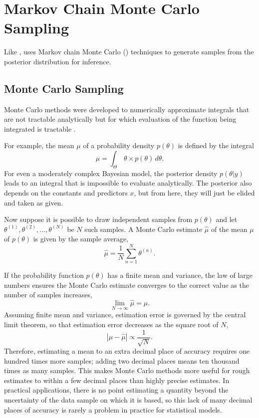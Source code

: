 \chapter{Markov Chain Monte Carlo Sampling}\label{mcmc.chapter}

\noindent
Like \BUGS, \Stan uses Markov chain Monte Carlo (\MCMC) techniques to
generate samples from the posterior distribution for inference.  


\section{Monte Carlo Sampling}

Monte Carlo methods were developed to numerically approximate
integrals that are not tractable analytically but for which evaluation
of the function being integrated is tractable
\citep{MetropolisUlam:1949}.

For example, the mean $\mu$ of a probability density $p(\theta)$ is
defined by the integral
\[
\mu = \int_{\Theta} \, \theta \times p(\theta) \, d\theta.
\]
For even a moderately complex Bayesian model, the posterior density
$p(\theta|y)$ leads to an integral that is impossible to evaluate
analytically.  The posterior also depends on the constants and
predictors $x$, but from here, they will just be elided and taken as
given.

Now suppose it is possible to draw independent samples from
$p(\theta)$ and let $\theta^{(1)},\theta^{(2)},\ldots,\theta^{(N)}$ be
$N$ such samples.  A Monte Carlo estimate $\hat{\mu}$ of the mean
$\mu$ of $p(\theta)$ is given by the sample average,
\[
\hat{\mu} = \frac{1}{N} \sum_{n=1}^N \theta^{(n)}.
\]

If the probability function $p(\theta)$ has a finite mean and
variance, the law of large numbers ensures the Monte Carlo estimate
converges to the correct value as the number of samples increases,
\[
\lim_{N \rightarrow \infty} \hat{\mu} = \mu.
\]
Assuming finite mean and variance, estimation error is governed by the
central limit theorem, so that estimation error decreases as the
square root of $N$,
\[
|\mu - \hat{\mu}| \propto \frac{1}{\sqrt{N}}.
\]
Therefore, estimating a mean to an extra decimal place of accuracy
requires one hundred times more samples; adding two decimal places
means ten thousand times as many samples.  This makes Monte Carlo
methods more useful for rough estimates to within a few decimal places
than highly precise estimates.  In practical applications, there is no
point estimating a quantity beyond the uncertainty of the data sample
on which it is based, so this lack of many decimal places of accuracy
is rarely a problem in practice for statistical models.


